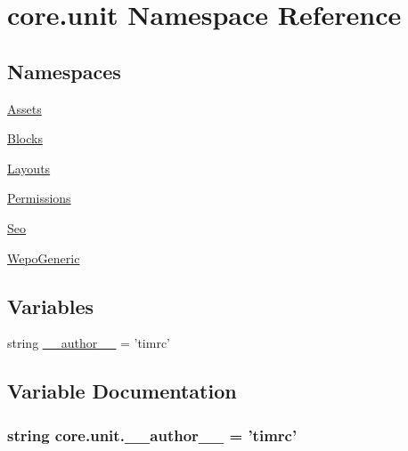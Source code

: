 \hypertarget{namespacecore_1_1unit}{\section{core.\-unit Namespace Reference}
\label{namespacecore_1_1unit}
}
\subsection*{Namespaces}
\begin{DoxyCompactItemize}
\item 
\hyperlink{namespacecore_1_1unit_1_1Assets}{Assets}
\item 
\hyperlink{namespacecore_1_1unit_1_1Blocks}{Blocks}
\item 
\hyperlink{namespacecore_1_1unit_1_1Layouts}{Layouts}
\item 
\hyperlink{namespacecore_1_1unit_1_1Permissions}{Permissions}
\item 
\hyperlink{namespacecore_1_1unit_1_1Seo}{Seo}
\item 
\hyperlink{namespacecore_1_1unit_1_1WepoGeneric}{Wepo\-Generic}
\end{DoxyCompactItemize}
\subsection*{Variables}
\begin{DoxyCompactItemize}
\item 
string \hyperlink{namespacecore_1_1unit_a19dc25223605b84c46ac5ef96a183229}{\-\_\-\-\_\-author\-\_\-\-\_\-} = 'timrc'
\end{DoxyCompactItemize}


\subsection{Variable Documentation}
\hypertarget{namespacecore_1_1unit_a19dc25223605b84c46ac5ef96a183229}{
\subsubsection[{\-\_\-\-\_\-author\-\_\-\-\_\-}]{\setlength{\rightskip}{0pt plus 5cm}string core.\-unit.\-\_\-\-\_\-author\-\_\-\-\_\- = 'timrc'}}\label{namespacecore_1_1unit_a19dc25223605b84c46ac5ef96a183229}

